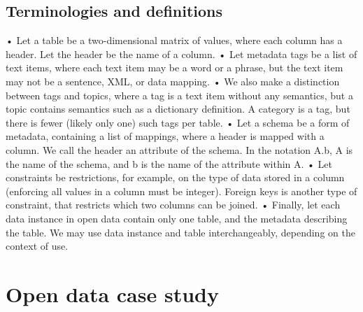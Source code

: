\subsection{Terminologies and definitions}
• Let a table be a two-dimensional matrix of values, where each column has a header. Let the header be the name of a column.
• Let metadata tags be a list of text items, where each text item may be a word or a phrase, but the text item may not be a sentence, XML, or data mapping.
• We also make a distinction between tags and topics, where a tag is a text item without any semantics, but a topic contains semantics such as a dictionary definition. A category is a tag, but there is fewer (likely only one) such tags per table.
• Let a schema be a form of metadata, containing a list of mappings, where a header is mapped with a column. We call the header an attribute of the schema. In the notation A.b, A is the name of the schema, and b is the name of the attribute within A.
• Let constraints be restrictions, for example, on the type of data stored in a column (enforcing all values in a column must be integer). Foreign keys is another type of constraint, that restricts which two columns can be joined.
• Finally, let each data instance in open data contain only one table, and the metadata describing the table. We may use data instance and table interchangeably, depending on the context of use.

\section{Open data case study}
\label{sec:OpenDataCaseStudy}

